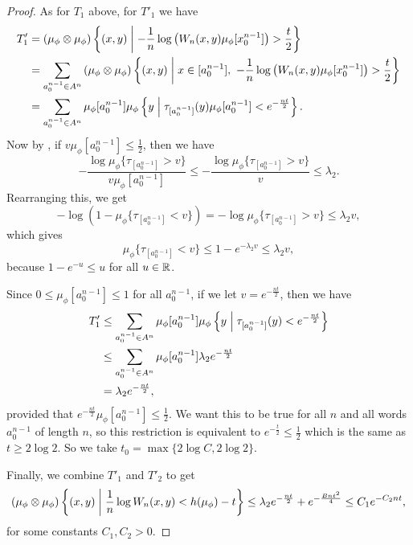 \begin{theorem}
\begin{proof}
		As for $T_1$ above, for $T'_1$ we have
		\begin{align*}
			T'_1 &= (\mu_\phi \otimes \mu_\phi)\left\{(x, y) \midmid -\frac{1}{n}\log\left(W_n(x, y) \mu_\phi[x_0^{n - 1}]\right) > \frac{t}{2}\right\} \\
				&= \sum_{a_0^{n - 1} \in A^n}{(\mu_\phi \otimes \mu_\phi)\left\{(x, y) \midmid x \in [a_0^{n - 1}],\ -\frac{1}{n}\log\left(W_n(x, y) \mu_\phi[x_0^{n - 1}]\right) > \frac{t}{2}\right\}} \\
				&= \sum_{a_0^{n - 1} \in A^n} \mu_\phi[a_0^{n - 1}]\mu_\phi\left\{y \midmid \tau_{[a_0^{n - 1}]}(y) \mu_\phi[a_0^{n - 1}] < e^{-\frac{nt}{2}}\right\}.
		\end{align*}
		Now by , if $v\mu_\phi[a_0^{n - 1}] \leq \frac{1}{2}$, then we have
		\[
			-\frac{\log{\mu_\phi\{\tau_{[a_0^{n - 1}]} > v\}}}{v\mu_\phi[a_0^{n - 1}]} \leq -\frac{\log{\mu_\phi\{\tau_{[a_0^{n - 1}]} > v\}}}{v} \leq \lambda_2.
		\]
		Rearranging this, we get
		\[
			-\log\left(1 - \mu_\phi\{\tau_{[a_0^{n - 1}]} < v\}\right) = -\log{\mu_\phi\{\tau_{[a_0^{n - 1}]} > v\}} \leq \lambda_2 v,
		\]
		which gives
		\[
			\mu_\phi\{\tau_{[a_0^{n - 1}]} < v\} \leq 1 - e^{-\lambda_2 v} \leq \lambda_2 v,
		\]
		because $1 - e^{-u} \leq u$ for all $u \in \mathbb{R}$.
		
		Since $0 \leq \mu_\phi[a_0^{n - 1}] \leq 1$ for all $a_0^{n - 1}$, if we let $v = e^{-\frac{nt}{2}}$, then we have
		\begin{align*}
			T'_1 &\leq \sum_{a_0^{n - 1} \in A^n} \mu_\phi[a_0^{n - 1}]\mu_\phi\left\{y \mathrel{}\middle|\mathrel{} \tau_{[a_0^{n - 1}]}(y) < e^{-\frac{nt}{2}}\right\} \\
				&\leq \sum_{a_0^{n - 1} \in A^n} \mu_\phi[a_0^{n - 1}] \lambda_2 e^{-\frac{nt}{2}} \\
				&= \lambda_2 e^{-\frac{nt}{2}},
		\end{align*}
		provided that $e^{-\frac{nt}{2}}\mu_\phi[a_0^{n - 1}] \leq \frac{1}{2}$. We want this to be true for all $n$ and all words $a_0^{n - 1}$ of length $n$, so this restriction is equivalent to $e^{-\frac{t}{2}} \leq \frac{1}{2}$ which is the same as $t \geq 2\log{2}$. So we take $t_0 = \max\{2\log{C}, 2 \log{2}\}$.
		
		Finally, we combine $T'_1$ and $T'_2$ to get
		\[
			(\mu_\phi \otimes \mu_\phi)\left\{(x, y) \mathrel{}\middle|\mathrel{} \frac{1}{n}\log{W_n(x, y)} < h(\mu_\phi) - t\right\} \leq \lambda_2 e^{-\frac{nt}{2}} + e^{-\frac{Bnt^2}{4}} \leq C_1e^{-C_2 nt},
		\]
		for some constants $C_1, C_2 > 0$.
	\end{proof}
\end{theorem}
